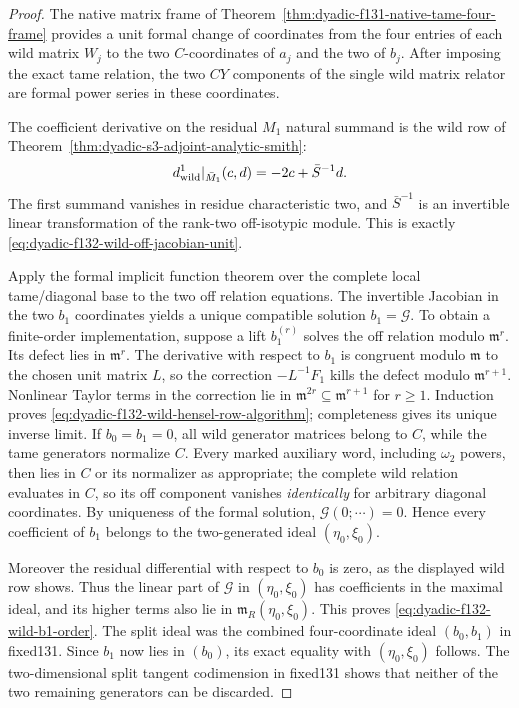 \documentclass[11pt]{article}
\theoremstyle{definition}
\begin{document}
\begin{proof}
The native matrix
frame of
Theorem~\ref{thm:dyadic-f131-native-tame-four-frame}
provides a unit
formal change of
coordinates from the
four entries of each
wild matrix $W_j$
to the two
$C$-coordinates
of $a_j$ and the
two of $b_j$.
After imposing the
exact tame relation,
the two $CY$
components of the
single wild matrix
relator are formal
power series in
these coordinates.

The coefficient
derivative on the
residual $M_1$
natural summand is
the wild row
of
Theorem~\ref{thm:dyadic-s3-adjoint-analytic-smith}:
\[
d^1_{\rm wild}|_{\bar M_1}
(c,d)=-2c+\bar S^{-1}d.
\]
The first summand
vanishes in residue
characteristic two,
and $\bar S^{-1}$
is an invertible
linear transformation
of the rank-two
off-isotypic module.
This is exactly
\eqref{eq:dyadic-f132-wild-off-jacobian-unit}.

Apply the formal
implicit function
theorem over the
complete local
tame/diagonal
base to the two
off relation equations.
The invertible
Jacobian in the
two $b_1$
coordinates yields
a unique compatible
solution $b_1=\mathcal G$.
To obtain a
finite-order
implementation,
suppose a lift
$b_1^{(r)}$ solves
the off relation
modulo $\mathfrak m^r$.
Its defect lies
in $\mathfrak m^r$.
The derivative
with respect to
$b_1$ is congruent
modulo $\mathfrak m$
to the chosen
unit matrix $L$,
so the correction
$-L^{-1}F_1$
kills the defect
modulo
$\mathfrak m^{r+1}$.
Nonlinear Taylor
terms in the
correction lie in
$\mathfrak m^{2r}
\subseteq
\mathfrak m^{r+1}$
for $r\ge1$.
Induction proves
\eqref{eq:dyadic-f132-wild-hensel-row-algorithm};
completeness gives
its unique inverse
limit.
If $b_0=b_1=0$,
all wild generator
matrices belong to
$C$, while the
tame generators
normalize $C$.
Every marked
auxiliary word,
including
$\omega_2$ powers,
then lies in
$C$ or its
normalizer as
appropriate;
the complete
wild relation
evaluates in
$C$, so its
off component
vanishes
\emph{identically}
for arbitrary
diagonal coordinates.
By uniqueness of
the formal solution,
$\mathcal G(0;\cdots)=0$.
Hence every
coefficient of
$b_1$ belongs
to the two-generated
ideal $(\eta_0,\xi_0)$.

Moreover the
residual differential
with respect to
$b_0$ is zero,
as the displayed
wild row shows.
Thus the linear
part of $\mathcal G$
in $(\eta_0,\xi_0)$
has coefficients
in the maximal
ideal, and its
higher terms also
lie in
$\mathfrak m_R
(\eta_0,\xi_0)$.
This proves
\eqref{eq:dyadic-f132-wild-b1-order}.
The split ideal
was the combined
four-coordinate
ideal $(b_0,b_1)$
in fixed131.
Since $b_1$ now
lies in $(b_0)$,
its exact equality
with $(\eta_0,\xi_0)$
follows.
The two-dimensional
split tangent
codimension in
fixed131 shows that
neither of the
two remaining
generators can be
discarded.
\end{proof}
\end{document}
